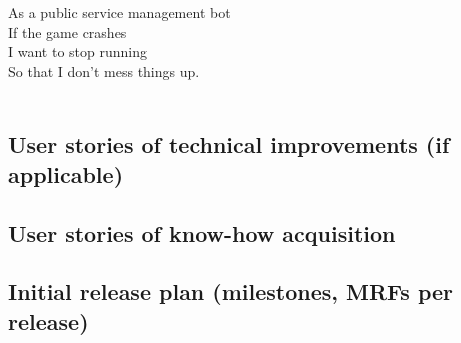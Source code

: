 As a public service management bot\\
If the game crashes\\
I want to stop running\\
So that I don't mess things up.\\
\\

\subsection{User stories of technical improvements (if applicable)}
\subsection{User stories of know-how acquisition}
\subsection{Initial release plan (milestones, MRFs per release)}

